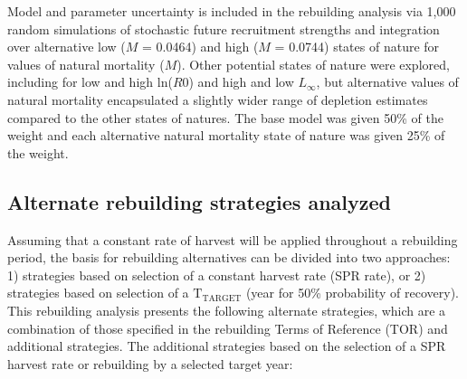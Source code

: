 \documentclass[11pt,
  english,
  a4paper,
]{article}
\begin{document}
\leavevmode\tagmcend\tagstructend


Model and parameter uncertainty is included in the rebuilding analysis via 1,000 random simulations of stochastic future recruitment strengths and integration over alternative low ({\(M\)\leavevmode\tagmcend\tagstructend} = 0.0464) and high ({\(M\)\leavevmode\tagmcend\tagstructend} = 0.0744) states of nature for values of natural mortality ({\(M\)\leavevmode\tagmcend\tagstructend}). Other potential states of nature were explored, including for low and high ln({\(R0\)\leavevmode\tagmcend\tagstructend}) and high and low {\(L_{\infty}\)\leavevmode\tagmcend\tagstructend}, but alternative values of natural mortality encapsulated a slightly wider range of depletion estimates compared to the other states of natures. The base model was given 50\% of the weight and each alternative natural mortality state of nature was given 25\% of the weight.

\leavevmode\tagmcend\tagstructend\par


\hypertarget{alternate-rebuilding-strategies-analyzed}{%
\subsection{Alternate rebuilding strategies analyzed}\label{alternate-rebuilding-strategies-analyzed}}

\leavevmode\tagmcend\tagstructend


Assuming that a constant rate of harvest will be applied throughout a rebuilding period, the basis for rebuilding alternatives can be divided into two approaches: 1) strategies based on selection of a constant harvest rate (SPR rate), or 2) strategies based on selection of a {\(\text{T}_\text{TARGET}\)\leavevmode\tagmcend\tagstructend} (year for 50\% probability of recovery). This rebuilding analysis presents the following alternate strategies, which are a combination of those specified in the rebuilding Terms of Reference (TOR) and additional strategies. The additional strategies based on the selection of a SPR harvest rate or rebuilding by a selected target year:
\end{document}
